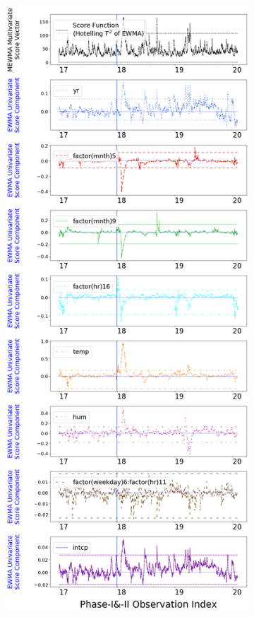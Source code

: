 \documentclass[twoside,11pt]{article}
\begin{document}
\begin{figure}[H]
\begin{subfigure}[t]{0.304\linewidth}
     \captionsetup{width=.95\linewidth}
     \caption{}
     \label{fig:bs_norm_retro_narrow}
\end{subfigure}
\begin{subfigure}[t]{0.374\linewidth}
     \centering
         \includegraphics[width=1.0\textwidth, trim=.0in .0in .0in .0in, clip]{../figures/v14/bike_sharing/reg_lin_PI_D_2/quadr/neg_single_bike_fisher_mlines_with_regu_1e-08_0_0001_0_01_99_99.png}

\end{subfigure}
\end{figure}
\end{document}

